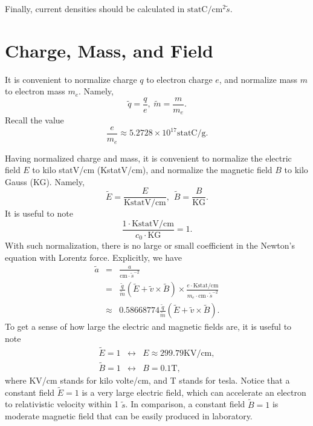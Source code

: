 \documentclass[paper=a4, fontsize=11pt]{scrartcl} %
\numberwithin{equation}{section} %
\numberwithin{figure}{section} %
\numberwithin{table}{section} %
\begin{document}
Finally, current densities should be calculated in $\text{statC} / \text{cm}^2 \tilde{s}$.

\section*{Charge, Mass, and Field}
It is convenient to normalize charge $q$ to electron charge $e$, and normalize mass $m$ to electron mass $m_e$. Namely,
\begin{equation}
	\tilde{q}=\frac{q}{e},\hspace{3pt} \tilde{m}=\frac{m}{m_e}.
\end{equation}
Recall the value
\begin{equation}
	\frac{e}{m_e}\approx 5.2728\times10^{17} \text{statC}/\text{g}.
\end{equation}

Having normalized charge and mass, it is convenient to normalize the electric field $E$ to kilo statV/cm (KstatV/cm), and normalize the magnetic field $B$ to kilo Gauss (KG). Namely,
\begin{equation}
	\tilde{E}=\frac{E}{\text{KstatV/cm}},\hspace{5pt} \tilde{B}=\frac{B}{\text{KG}}.
\end{equation}
It is useful to note
\begin{equation}
	\frac{1\cdot\text{KstatV/cm}}{c_0\cdot\text{KG}}=1.
\end{equation}
With such normalization, there is no large or small coefficient in the Newton's equation with Lorentz force. Explicitly, we have
\begin{eqnarray}
	\tilde{a}&=&\frac{a}{\text{cm}\cdot\tilde{s}^{-2}} \\
                 &=& \frac{\tilde{q}}{\tilde{m}}(\tilde{E}+\tilde{v}\times\tilde{B})
			\times\frac{e\cdot\text{Kstat/cm}}{m_e\cdot\text{cm}\cdot\tilde{s}^{-2}} \\
                 &\approx& 0.58668774 \frac{\tilde{q}}{\tilde{m}}(\tilde{E}+\tilde{v}\times\tilde{B}).
\end{eqnarray}
To get a sense of how large the electric and magnetic fields are, it is useful to note
\begin{eqnarray}
	\tilde{E}=1&\leftrightarrow& E\approx 299.79\text{KV/cm},\\
	\tilde{B}=1&\leftrightarrow& B=0.1\text{T},
\end{eqnarray}
where KV/cm stands for kilo volte/cm, and T stands for tesla. Notice that a constant field $\tilde{E}=1$ is a very large electric field, which can accelerate an electron to relativistic velocity within 1 $\tilde{s}$. In comparison, a constant field $\tilde{B}=1$ is moderate magnetic field that can be easily produced in laboratory.

\end{document}
